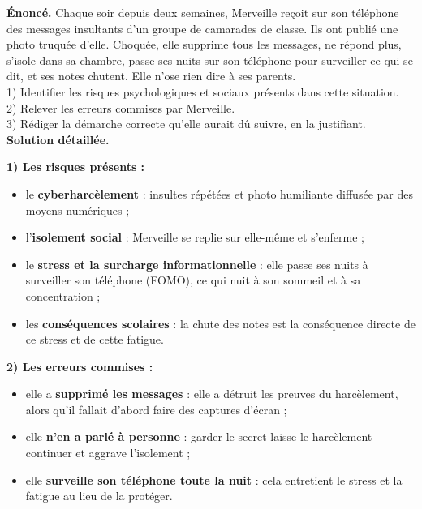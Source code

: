 \documentclass[11pt]{article}
\begin{document}
\begin{exoresolu}
\textbf{Énoncé.} Chaque soir depuis deux semaines, Merveille reçoit sur son téléphone des messages insultants d'un groupe de camarades de classe. Ils ont publié une photo truquée d'elle. Choquée, elle supprime tous les messages, ne répond plus, s'isole dans sa chambre, passe ses nuits sur son téléphone pour surveiller ce qui se dit, et ses notes chutent. Elle n'ose rien dire à ses parents.\\[2pt]
1) Identifier les risques psychologiques et sociaux présents dans cette situation.\\
2) Relever les erreurs commises par Merveille.\\
3) Rédiger la démarche correcte qu'elle aurait dû suivre, en la justifiant.
\tcblower
\textbf{Solution détaillée.}

\textbf{1) Les risques présents :}
\begin{itemize}
  \item le \textbf{cyberharcèlement} : insultes répétées et photo humiliante diffusée par des moyens numériques ;
  \item l'\textbf{isolement social} : Merveille se replie sur elle-même et s'enferme ;
  \item le \textbf{stress et la surcharge informationnelle} : elle passe ses nuits à surveiller son téléphone (FOMO), ce qui nuit à son sommeil et à sa concentration ;
  \item les \textbf{conséquences scolaires} : la chute des notes est la conséquence directe de ce stress et de cette fatigue.
\end{itemize}

\textbf{2) Les erreurs commises :}
\begin{itemize}
  \item elle a \textbf{supprimé les messages} : elle a détruit les preuves du harcèlement, alors qu'il fallait d'abord faire des captures d'écran ;
  \item elle \textbf{n'en a parlé à personne} : garder le secret laisse le harcèlement continuer et aggrave l'isolement ;
  \item elle \textbf{surveille son téléphone toute la nuit} : cela entretient le stress et la fatigue au lieu de la protéger.
\end{itemize}


\end{exoresolu}
\end{document}
